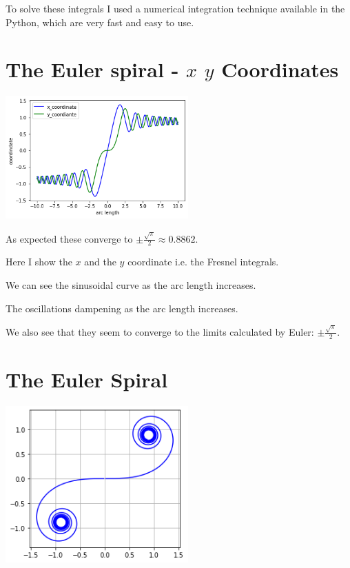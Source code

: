 \documentclass[12pt]{article} %
\theoremstyle{definition}
\theoremstyle{theorem}
\begin{document}
To solve these integrals I used a numerical integration technique available in the Python, which  are very fast and easy to use. 

\section{The Euler spiral - $x$ $y$ Coordinates}
\begin{tcolorbox}
	\begin{minipage}{\linewidth}
		\centering
		\includegraphics[width=70mm, scale=0.5]{euler_x_vs_y.png}
	\end{minipage}
	As expected these converge to $\pm \frac{\sqrt{\pi}}{2} \approx 0.8862$.
\end{tcolorbox}

Here I show the $x$ and the $y$ coordinate i.e. the Fresnel integrals.

We can see the sinusoidal curve as the arc length increases.

The oscillations dampening as the arc length increases. 

We also see that they seem to converge to the limits calculated by Euler: $\pm \frac{\sqrt{\pi}}{2}$. 

\section{The Euler Spiral}
\begin{tcolorbox}
	\begin{minipage}{\linewidth}
		\centering
		\includegraphics[width=70mm, scale=0.5]{euler_spiral.png}
	\end{minipage}
\end{tcolorbox}
\end{document}

